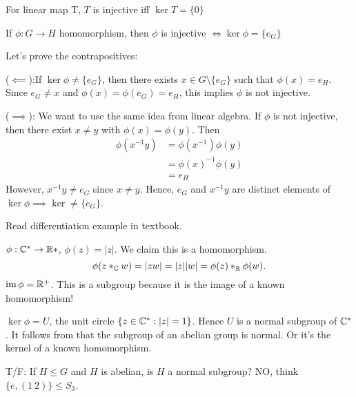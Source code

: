 \documentclass[class=article,crop=false]{standalone}
\begin{document}
\begin{intuition}
	For linear map T, $ T$ is injective iff  $ \ker T= \{0\} $
\end{intuition}


\begin{thm}[]
If $ \phi:G \to H$ homomorphism, then
$ \phi$ is injective $ \iff \ker  \phi = \{e_G\} $
\end{thm}

\begin{prf}
Let's prove the contrapositives:

($ \impliedby$):If $ \ker \phi \neq \{e_G\} $, then there exists $ x \in G \setminus \{e_G\} $ such that $ \phi(x)=e_H$. Since $ e_G \neq x$ and  $ \phi(x) = \phi(e_G) =e_H$, this implies $ \phi$ is not injective.

($ \implies$): We want to use the same idea from linear algebra. If $ \phi$ is not injective, then there exist $ x \neq y$ with  $ \phi(x)=\phi(y)$. Then
\begin{align*}
	\phi(x^{-1} y) &= \phi(x^{-1}) \phi(y) \\
		       &= \phi(x)^{-1} \phi(y) \\
		       &= e_H 
\end{align*}
However, $ x^{-1} y \neq e_G$ since $ x\neq y$. Hence,  $ e_G$ and  $ x^{-1}y$ are distinct elements of $ \ker \phi \implies \ker \neq \{e_G\} $.
\end{prf}

\begin{eg}[]
Read differentiation example in textbook.
\end{eg}

\begin{eg}[]
	$ \phi: \mathbb{C}^* \to \mathbb{R}*$, $ \phi(z)=|z|$. We claim this is a homomorphism. 
	\[
		\phi(z *_{ \mathbb{C}} w) = |zw| = |z||w| = \phi(z) *_{ \mathbb{R}} \phi(w)
	.\]
$ \operatorname{im} \phi = \mathbb{R}^+$. This is a subgroup because it is the image of a known homomorphism!

$ \ker \phi = U$, the unit circle $ \{z \in \mathbb{C}^* : |z|=1\} $. Hence $ U$ is a normal subgroup of  $ \mathbb{C}^* $. It follows from that the subgroup of an abelian group is normal. Or it's the kernel of a known homomorphism.
\end{eg}

\begin{note}[]
	T/F: If $ H \leq G $ and  $ H$ is abelian, is  $ H$ a normal subgroup? NO, think  $ \{e, (1\ 2)\} \leq S_3 $.
\end{note}
\end{document}
